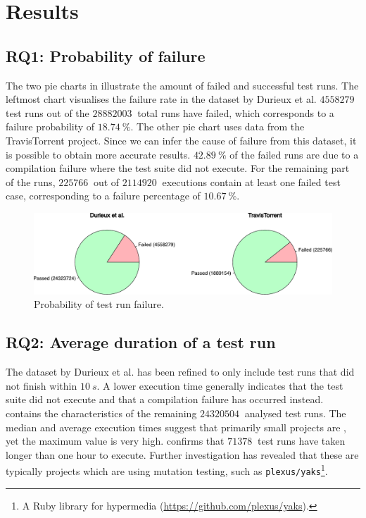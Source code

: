 
\section{Results}

\subsection{RQ1: Probability of failure}\label{ssec:results-rq1}
The two pie charts in  illustrate the amount of failed and successful test runs. The leftmost chart visualises the failure rate in the dataset \cite{travisanalysis} by Durieux et al. $\SI{4558279}{}$ test runs out of the $\SI{28882003}{}$ total runs have failed, which corresponds to a failure probability of $\SI{18.74}{\percent}$. The other pie chart uses data from the TravisTorrent \cite{msr17challenge} project. Since we can infer the cause of failure from this dataset, it is possible to obtain more accurate results. $\SI{42.89}{\percent}$ of the failed runs are due to a compilation failure where the test suite did not execute. For the remaining part of the runs, $\SI{225766}{}$ out of $\SI{2114920}{}$ executions contain at least one failed test case, corresponding to a failure percentage of $\SI{10.67}{\percent}$.

\begin{figure}[htbp!]
	\centering
	\includegraphics[width=\textwidth]{assets/charts/rq1-failure-probability.pdf}
	\caption{Probability of test run failure.}
	\label{fig:rq1-failure-probability}
\end{figure}

\subsection{RQ2: Average duration of a test run}
The dataset by Durieux et al. \cite{travisanalysis} has been refined to only include test runs that did not finish within $\SI{10}{s}$. A lower execution time generally indicates that the test suite did not execute and that a compilation failure has occurred instead.  contains the characteristics of the remaining $\SI{24320504}{}$ analysed test runs. The median and average execution times suggest that primarily small projects are \travisci{}, yet the maximum value is very high.  confirms that $\SI{71378}{}$ test runs have taken longer than one hour to execute. Further investigation has revealed that these are typically projects which are using mutation testing, such as \texttt{plexus/yaks}\footnote{A Ruby library for hypermedia (\url{https://github.com/plexus/yaks}).}.

